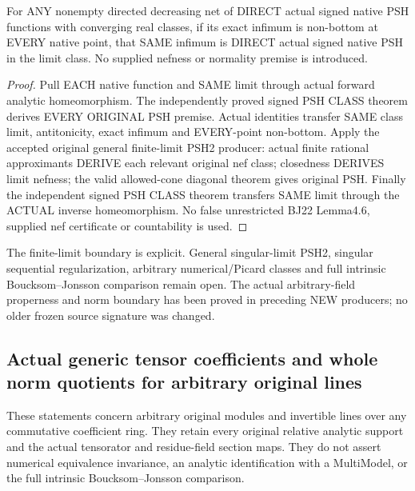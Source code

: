 \begin{theorem}
\label{thm:seven-native-signed-finite-limit-psh2-arbitrary-field}
\leanok
For ANY nonempty directed decreasing net of DIRECT actual signed native
PSH functions with converging real classes, if its exact infimum is
non-bottom at EVERY native point, that SAME infimum is DIRECT actual
signed native PSH in the limit class. No supplied nefness or normality
premise is introduced.
\end{theorem}
\begin{proof}
Pull EACH native function and SAME limit through actual forward analytic
homeomorphism. The independently proved signed PSH CLASS theorem derives
EVERY ORIGINAL PSH premise. Actual identities transfer SAME class limit,
antitonicity, exact infimum and EVERY-point non-bottom. Apply the accepted
original general finite-limit PSH2 producer: actual finite rational
approximants DERIVE each relevant original nef class; closedness DERIVES
limit nefness; the valid allowed-cone diagonal theorem gives original
PSH. Finally the independent signed PSH CLASS theorem transfers SAME
limit through the ACTUAL inverse homeomorphism. No false unrestricted
BJ22 Lemma4.6, supplied nef certificate or countability is used.
\end{proof}

The finite-limit boundary is explicit. General singular-limit PSH2,
singular sequential regularization, arbitrary numerical/Picard classes
and full intrinsic Boucksom--Jonsson comparison remain open. The actual arbitrary-field properness and norm boundary has been proved
in preceding NEW producers; no older frozen source signature was changed.

\subsection{Actual generic tensor coefficients and whole norm quotients for arbitrary original lines}
These statements concern arbitrary original modules and invertible lines over
any commutative coefficient ring. They retain every original relative
analytic support and the actual tensorator and residue-field section maps.
They do not assert numerical equivalence invariance, an analytic identification
with a MultiModel, or the full intrinsic Boucksom--Jonsson comparison.

